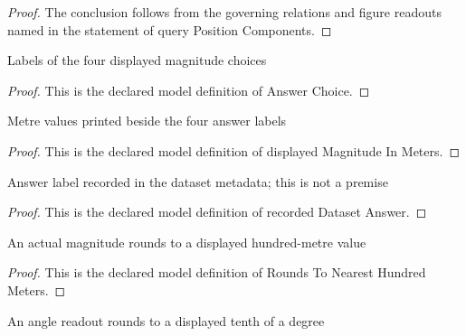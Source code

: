 \begin{proof}
  The conclusion follows from the governing relations and figure readouts named in the statement of query Position Components.
\end{proof}
\begin{definition}
  \label{def:physics:phyx-mini-0679:phyxminiproblems-problemphyxmini0679-answerchoice}
  Labels of the four displayed magnitude choices
\end{definition}
\begin{proof}
  This is the declared model definition of Answer Choice.
\end{proof}
\begin{definition}
  \label{def:physics:phyx-mini-0679:phyxminiproblems-problemphyxmini0679-displayedmagnitudeinmeters}
  Metre values printed beside the four answer labels
\end{definition}
\begin{proof}
  This is the declared model definition of displayed Magnitude In Meters.
\end{proof}
\begin{definition}
  \label{def:physics:phyx-mini-0679:phyxminiproblems-problemphyxmini0679-recordeddatasetanswer}
  Answer label recorded in the dataset metadata; this is not a premise
\end{definition}
\begin{proof}
  This is the declared model definition of recorded Dataset Answer.
\end{proof}
\begin{definition}
  \label{def:physics:phyx-mini-0679:phyxminiproblems-problemphyxmini0679-roundstonearesthundredmeters}
  An actual magnitude rounds to a displayed hundred-metre value
\end{definition}
\begin{proof}
  This is the declared model definition of Rounds To Nearest Hundred Meters.
\end{proof}
\begin{definition}
  \label{def:physics:phyx-mini-0679:phyxminiproblems-problemphyxmini0679-roundstonearesttenthdegree}
  An angle readout rounds to a displayed tenth of a degree
\end{definition}
